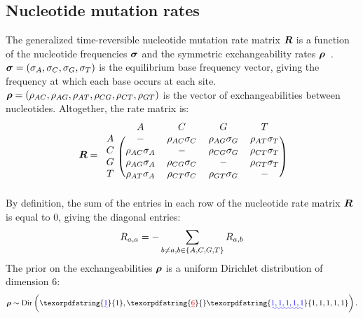 \documentclass{article}
\providecommand{\DIFaddtex}[1]{{\protect\color{blue}\uwave{#1}}} %
\providecommand{\DIFdeltex}[1]{{\protect\color{red}\sout{#1}}}                      %
\providecommand{\DIFaddbegin}{} %
\providecommand{\DIFaddend}{} %
\providecommand{\DIFdelbegin}{} %
\providecommand{\DIFdelend}{} %
\providecommand{\DIFadd}[1]{\texorpdfstring{\DIFaddtex{#1}}{#1}} %
\providecommand{\DIFdel}[1]{\texorpdfstring{\DIFdeltex{#1}}{}} %
\begin{document}
    \subsection{Nucleotide mutation rates}
    The generalized time-reversible nucleotide mutation rate matrix $\bm{R}$ is a function of the nucleotide frequencies $\bm{\sigma}$ and the symmetric exchangeability rates $\bm{\rho}$~\citep{Tavare1986}.
    $\bm{\sigma} = (\sigma_A , \sigma_C , \sigma_G , \sigma_T)$ is the equilibrium base frequency vector, giving the frequency at which each base occurs at each site.
    $\bm{\rho} = \left( \rho_{AC}, \rho_{AG}, \rho_{AT}, \rho_{CG}, \rho_{CT}, \rho_{GT}\right)$ is the vector of exchangeabilities between nucleotides.
    Altogether, the rate matrix is:
    \begin{equation}
        \label{eq:gtr-mutrates}
        \Mutmatrix =
        \begin{blockarray}{ccccc}
            & A & C & G & T \\
            \begin{block}{c(cccc)}
                A & - & {\exchan_{AC}\mutequi_C} & {\exchan_{AG}\mutequi_G} & {\exchan_{AT}\mutequi_T} \\
                C & {\exchan_{AC}\mutequi_A} &                        - & {\exchan_{CG}\mutequi_G} & {\exchan_{CT}\mutequi_T} \\
                G & {\exchan_{AG}\mutequi_A} & {\exchan_{CG}\mutequi_C} &                        - & {\exchan_{GT}\mutequi_T} \\
                T & {\exchan_{AT}\mutequi_A} & {\exchan_{CT}\mutequi_C} & {\exchan_{GT}\mutequi_G} & - \\
            \end{block}
        \end{blockarray}
    \end{equation}
    By definition, the sum of the entries in each row of the nucleotide rate matrix $\bm{R}$ is equal to $0$, giving the diagonal entries:
    \begin{equation}
        R_{a,a} = - \sum\limits_{ b \neq a, b \in \{A, C, G, T\} } R_{a,b}
    \end{equation}
    The {prior} on the exchangeabilities $\bm{\rho}$ is a uniform Dirichlet distribution of dimension $6$:
    \begin{equation}
        \label{eq:DistribExchan}
        \Exchan \sim \text{Dir}\left( \DIFdelbegin %
\DIFdelend \DIFaddbegin \DIFadd{1}\DIFaddend ,\DIFdelbegin \DIFdel{6}\DIFdelend \DIFaddbegin \DIFadd{1,1,1,1,1 }\DIFaddend \right).
    \end{equation}
\end{document}
